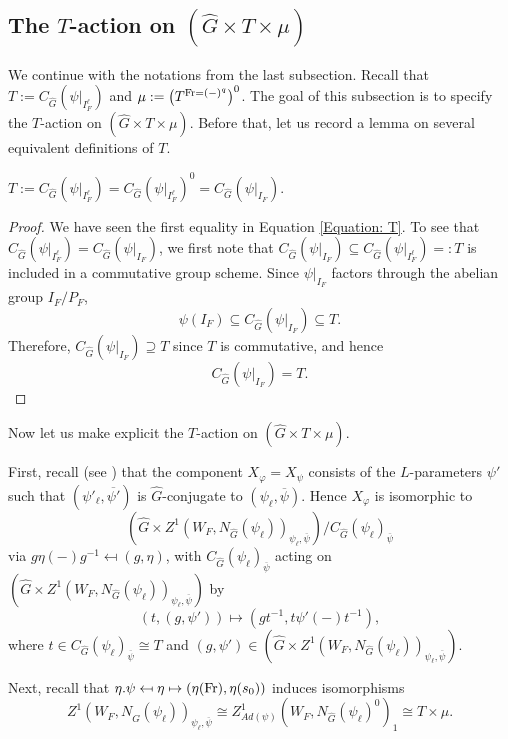 \subsection{The $T$-action on $(\hat{G} \times T \times \mu)$}\label{Subsection T-action}

We continue with the notations from the last subsection. Recall that $T:=C_{\hat{G}}(\psi|_{I_F^{\ell}})$ and $\mu:=\left(T^{\operatorname{Fr}=(-)^q}\right)^0$. The goal of this subsection is to specify the $T$-action on $(\hat{G} \times T \times \mu)$. Before that, let us record a lemma on several equivalent definitions of $T$.

\begin{lemma}\label{Lemma: T}
	$T:=C_{\hat{G}}(\psi|_{I_F^{\ell}}) = C_{\hat{G}}(\psi|_{I_F^{\ell}})^0 = C_{\hat{G}}(\psi|_{I_F}).$
\end{lemma}

\begin{proof}
	We have seen the first equality in Equation \eqref{Equation: T}. To see that $C_{\hat{G}}(\psi|_{I_F^{\ell}})=C_{\hat{G}}(\psi|_{I_F})$, we first note that $C_{\hat{G}}(\psi|_{I_F}) \subseteq C_{\hat{G}}(\psi|_{I_F^{\ell}})=:T$ is included in a commutative group scheme. Since $\psi|_{I_F}$ factors through the abelian group $I_F/P_F$, 
	$$\psi(I_F) \subseteq C_{\hat{G}}(\psi|_{I_F}) \subseteq T.$$
	Therefore, $C_{\hat{G}}(\psi|_{I_F}) \supseteq T$ since $T$ is commutative, and hence
	$$C_{\hat{G}}(\psi|_{I_F}) = T.$$
\end{proof}

Now let us make explicit the $T$-action on $(\hat{G} \times T \times \mu)$.

First, recall (see \cite[Subsection 4.6]{dat2022ihes}) that the component $X_{\varphi}=X_{\psi}$ consists of the $L$-parameters $\psi'$ such that $(\psi'_{\ell}, \overline{\psi'})$ is $\hat{G}$-conjugate to $(\psi_{\ell}, \overline{\psi})$. Hence $X_{\varphi}$ is isomorphic to 
$$(\hat{G} \times Z^1(W_F, N_{\hat{G}}(\psi_{\ell}))_{\psi_{\ell}, \overline{\psi}})/C_{\hat{G}}(\psi_{\ell})_{\overline{\psi}}$$
via $g\eta(-)g^{-1} \mapsfrom (g, \eta)$, with $C_{\hat{G}}(\psi_{\ell})_{\overline{\psi}}$ acting on $(\hat{G} \times Z^1(W_F, N_{\hat{G}}(\psi_{\ell}))_{\psi_{\ell}, \overline{\psi}})$ by 
$$(t, (g, \psi')) \mapsto (gt^{-1}, t\psi'(-)t^{-1}),$$
where $t \in C_{\hat{G}}(\psi_{\ell})_{\overline{\psi}} \cong T$ and $(g, \psi') \in (\hat{G} \times Z^1(W_F, N_{\hat{G}}(\psi_{\ell}))_{\psi_{\ell}, \overline{\psi}})$.

Next, recall that $\eta.\psi \mapsfrom \eta \mapsto (\eta(\operatorname{Fr}), \eta(s_0))$ induces isomorphisms
\begin{equation}\label{Equation: Z^1_Ad}
	Z^1(W_F, N_{\hat{G}}(\psi_{\ell}))_{\psi_{\ell}, \overline{\psi}} \cong Z^1_{Ad(\psi)}(W_F, N_{\hat{G}}(\psi_{\ell})^0)_1 \cong T \times \mu.
\end{equation}


